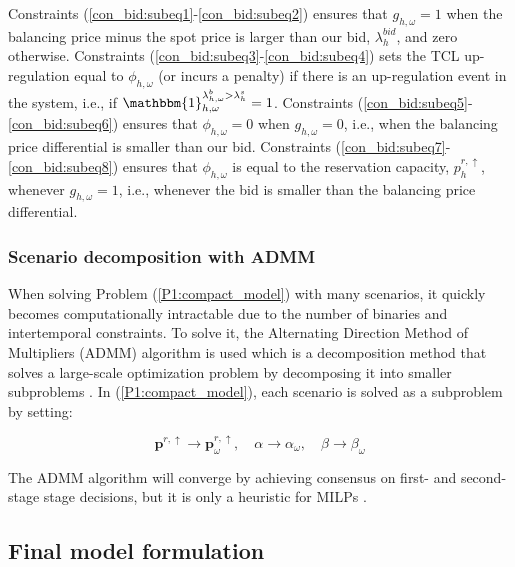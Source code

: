 Constraints (\ref{con_bid:subeq1}-\ref{con_bid:subeq2}) ensures that $g_{h,\omega} = 1$ when the balancing price minus the spot price is larger than our bid, $\lambda^{bid}_{h}$, and zero otherwise. Constraints (\ref{con_bid:subeq3}-\ref{con_bid:subeq4}) sets the TCL up-regulation equal to $\phi_{h,\omega}$ (or incurs a penalty) if there is an up-regulation event in the system, i.e., if $\mathbbm{1}_{h,\omega}^{\lambda^{b}_{h,\omega} > \lambda^{s}_{h}} = 1$. Constraints (\ref{con_bid:subeq5}-\ref{con_bid:subeq6}) ensures that $\phi_{h,\omega} = 0$ when $g_{h,\omega} = 0$, i.e., when the balancing price differential is smaller than our bid. Constraints (\ref{con_bid:subeq7}-\ref{con_bid:subeq8}) ensures that $\phi_{h,\omega}$ is equal to the reservation capacity, $p^{r,\uparrow}_{h}$, whenever $g_{h,\omega} = 1$, i.e., whenever the bid is smaller than the balancing price differential.

\subsubsection{Scenario decomposition with ADMM}

When solving Problem (\ref{P1:compact_model}) with many scenarios, it quickly becomes computationally intractable due to the number of binaries and intertemporal constraints. To solve it, the Alternating Direction Method of Multipliers (ADMM) algorithm is used which is a decomposition method that solves a large-scale optimization problem by decomposing it into smaller subproblems \cite{boyd2011distributed}. In (\ref{P1:compact_model}), each scenario is solved as a subproblem by setting:

\begin{equation}\label{eq:non_anticipativity}
    \bm{p}^{r,\uparrow} \rightarrow \bm{p}^{r,\uparrow}_{\omega}, \quad \alpha \rightarrow \alpha_{\omega}, \quad \beta \rightarrow \beta_{\omega}
\end{equation}

The ADMM algorithm will converge by achieving consensus on first- and second-stage stage decisions, but it is only a heuristic for MILPs \cite{hong2016convergence}.

\subsection{Final model formulation}\label{sec:final_model}


